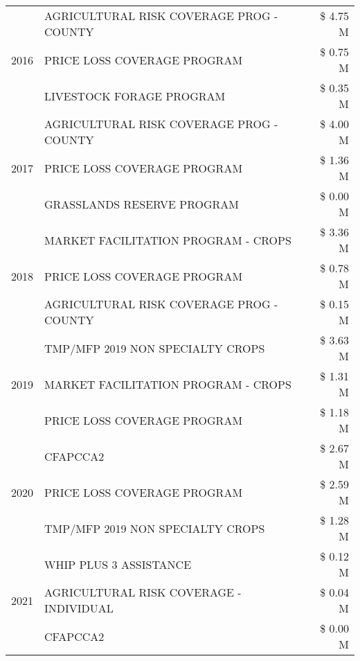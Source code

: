 \begin{tabular}{llr}
\cline{1-3}
\multirow[t]{3}{*}{2016} & AGRICULTURAL RISK COVERAGE PROG - COUNTY & \$ 4.75 M \\
 & PRICE LOSS COVERAGE PROGRAM & \$ 0.75 M \\
 & LIVESTOCK FORAGE PROGRAM & \$ 0.35 M \\
\cline{1-3}
\multirow[t]{3}{*}{2017} & AGRICULTURAL RISK COVERAGE PROG - COUNTY & \$ 4.00 M \\
 & PRICE LOSS COVERAGE PROGRAM & \$ 1.36 M \\
 & GRASSLANDS RESERVE PROGRAM & \$ 0.00 M \\
\cline{1-3}
\multirow[t]{3}{*}{2018} & MARKET FACILITATION PROGRAM - CROPS & \$ 3.36 M \\
 & PRICE LOSS COVERAGE PROGRAM & \$ 0.78 M \\
 & AGRICULTURAL RISK COVERAGE PROG - COUNTY & \$ 0.15 M \\
\cline{1-3}
\multirow[t]{3}{*}{2019} & TMP/MFP 2019 NON SPECIALTY CROPS & \$ 3.63 M \\
 & MARKET FACILITATION PROGRAM - CROPS & \$ 1.31 M \\
 & PRICE LOSS COVERAGE PROGRAM & \$ 1.18 M \\
\cline{1-3}
\multirow[t]{3}{*}{2020} & CFAPCCA2 & \$ 2.67 M \\
 & PRICE LOSS COVERAGE PROGRAM & \$ 2.59 M \\
 & TMP/MFP 2019 NON SPECIALTY CROPS & \$ 1.28 M \\
\cline{1-3}
\multirow[t]{3}{*}{2021} & WHIP PLUS 3 ASSISTANCE & \$ 0.12 M \\
 & AGRICULTURAL RISK COVERAGE - INDIVIDUAL & \$ 0.04 M \\
 & CFAPCCA2 & \$ 0.00 M \\
\cline{1-3}
\bottomrule
\end{tabular}
